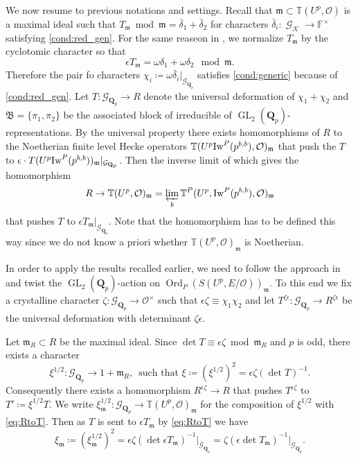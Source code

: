 \documentclass[leqno]{amsart}
\theoremstyle{definition}
\theoremstyle{remark}
\newcommand{\oo}{\mathcal{O}}
\newcommand{\fF}{\mathbb{F}} %
\newcommand{\Qp}{\mathbf{Q}_p}
\DeclareMathOperator{\GL}{GL}
\DeclareMathOperator{\Gal}{\mathcal{G}}
\newcommand{\fm}{\mathfrak{m}}
\DeclareMathOperator{\Ord}{Ord} %
\newcommand{\Gp}{\mathcal{G}_{\Qp}} %
\newcommand{\B}{\mathfrak B} %
\newcommand{\K}{{\mathcal{K}}} %
\newcommand{\Iw}{\textnormal{Iw}} %
\newcommand{\TT}{\mathbb{T}} %
\begin{document}
We now resume to previous notations and settings.
Recall that $\fm\subset \TT(U^p,\oo)$ 
is a maximal ideal such that
$T_\fm\bmod\fm =\bar{\delta}_1+\bar{\delta}_2$
for characters $\bar{\delta}_i\colon \Gal_\K\to \fF^\times$
satisfying \eqref{cond:red_gen}.
For the same reaseon in \cite[Rem 3.5.3]{pan},
we normalize $T_\fm$ by the cyclotomic character so that
\[
    \epsilon T_\fm=\omega\delta_1+\omega\delta_2\mod\fm.
\]
Therefore the pair fo characters
$\chi_i\coloneqq \omega\bar{\delta}_i\vert_{\Gp}$
satisfies \eqref{cond:generic} because of 
\eqref{cond:red_gen}.
Let $T\colon \Gp\to R$
denote the universal deformation 
of $\chi_1+\chi_2$
and $\B=\{\pi_1,\pi_2\}$
be the associated block of irreducible of $\GL_2(\Qp)$-representations.
By the universal property
there exists homomorphisms of $R$
to the Noetherian finite level
Hecke operators $\TT(U^p\Iw^P(p^{b,b}),\oo)_\fm$
that push the $T$ to 
$\epsilon\cdot T(U^p\Iw^P(p^{b,b}))_\fm\vert_{\Gp}$.
Then the inverse limit of which
gives the homomorphism
\begin{equation}\label{eq:RtoT}
    R\to \TT(U^p,\oo)_{\fm}=
    \varprojlim_b\TT^P(U^p,\Iw^P(p^{b,b}),\oo)_{\fm}
\end{equation}
that pushes $T$ to $\epsilon T_\fm\vert_{\Gp}$.
Note that the homomorphism has to be defined this way
since we do not know a priori whether
$\TT(U^p,\oo)_{\fm}$ is Noetherian.

In order to apply the results recalled earlier,
we need to follow the approach in \cite[\S 5]{urban}
and twist the $\GL_2(\Qp)$-action on 
$\Ord_P(S(U^p,E/\oo))_\fm$.
To this end we fix a crystalline character
$\zeta\colon \Gp\to \oo^\times$
such that $\epsilon\zeta\equiv\chi_1\chi_2$
and let 
$T^{\zeta\epsilon}\colon \Gp\to R^{\zeta\epsilon}$
be the universal deformation
with determinant $\zeta\epsilon$.

Let $\fm_R\subset R$ be the maximal ideal.
Since $\det T\equiv \epsilon\zeta\bmod \fm_R$ and $p$ is odd,
there exists a character
\begin{equation}\label{eq:root_char}
	\xi^{1/2}
    \colon \Gp\to 1+
    \fm_{R},
    \, \text{ such that }
	\xi\coloneqq(\xi^{1/2})^2=\epsilon\zeta(\det T)^{-1}.
\end{equation}
Consequently there exists a homomorphism 
$R^{\epsilon\zeta}\to R$ that pushes 
$T^{\epsilon\zeta}$ to $T'\coloneqq \xi^{1/2}T$.
We write $\xi_\fm^{1/2}\colon \Gp\to \TT(U^p,\oo)_\fm$
for the composition of $\xi^{1/2}$ with \eqref{eq:RtoT}.
Then as $T$ is sent to $\epsilon T_\fm$ by \eqref{eq:RtoT} we have
\begin{equation}\label{eq:root_charm}
	\xi_\fm\coloneqq (\xi_\fm^{1/2})^2=
	\epsilon\zeta(\det \epsilon T_\fm)^{-1}\vert_{\Gp}
	=\zeta(\epsilon\det T_\fm)^{-1}\vert_{\Gp}.
\end{equation}
\end{document}
